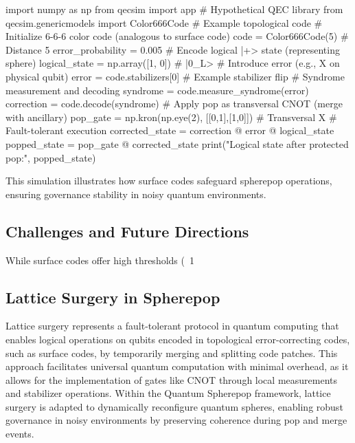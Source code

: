 \documentclass[12pt]{article}
\begin{document}
\begin{codeblock}
import numpy as np
from qecsim import app # Hypothetical QEC library
from qecsim.genericmodels import Color666Code # Example topological code
# Initialize 6-6-6 color code (analogous to surface code)
code = Color666Code(5) # Distance 5
error_probability = 0.005
# Encode logical |+> state (representing sphere)
logical_state = np.array([1, 0]) # |0_L>
# Introduce error (e.g., X on physical qubit)
error = code.stabilizers[0] # Example stabilizer flip
# Syndrome measurement and decoding
syndrome = code.measure_syndrome(error)
correction = code.decode(syndrome)
# Apply pop as transversal CNOT (merge with ancillary)
pop_gate = np.kron(np.eye(2), [[0,1],[1,0]]) # Transversal X
# Fault-tolerant execution
corrected_state = correction @ error @ logical_state
popped_state = pop_gate @ corrected_state
print("Logical state after protected pop:", popped_state)
\end{codeblock}

This simulation illustrates how surface codes safeguard spherepop operations, ensuring governance stability in noisy quantum environments.

\subsection{Challenges and Future Directions}
While surface codes offer high thresholds (~1%

\subsection{Lattice Surgery in Spherepop}
Lattice surgery represents a fault-tolerant protocol in quantum computing that enables logical operations on qubits encoded in topological error-correcting codes, such as surface codes, by temporarily merging and splitting code patches. This approach facilitates universal quantum computation with minimal overhead, as it allows for the implementation of gates like CNOT through local measurements and stabilizer operations. Within the Quantum Spherepop framework, lattice surgery is adapted to dynamically reconfigure quantum spheres, enabling robust governance in noisy environments by preserving coherence during pop and merge events.
\end{document}
